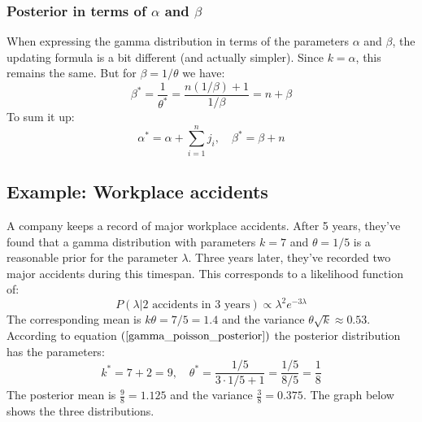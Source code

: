 \documentclass[12pt, a4paper]{article}
\begin{document}
\subsubsection{Posterior in terms of $\alpha$ and $\beta$}
When expressing the gamma distribution in terms of the parameters $\alpha$ and $\beta$, the updating formula is a bit different (and actually simpler). Since $k=\alpha$, this remains the same. But for $\beta=1/\theta$ we have:
\begin{equation}
\beta^*=\frac{1}{\theta^*}=\frac{n(1/\beta)+1}{1/\beta}=n+\beta
\end{equation}
To sum it up:
\begin{equation}
\alpha^*=\alpha+\sum_{i=1}^n j_i,\quad\beta^*=\beta+n
\end{equation}

\subsection{Example: Workplace accidents}
A company keeps a record of major workplace accidents. After 5 years, they've found that a gamma distribution with parameters $k=7$ and $\theta=1/5$ is a reasonable prior for the parameter $\lambda$. Three years later, they've recorded two major accidents during this timespan. This corresponds to a likelihood function of:
\begin{equation}
P(\lambda|2\textrm{ accidents in }3\textrm{ years})\propto \lambda^{2}e^{-3\lambda}
\end{equation}
The corresponding mean is $k\theta=7/5=1.4$ and the variance $\theta\sqrt{k}\approx 0.53$. According to equation $(\ref{gamma_poisson_posterior})$ the posterior distribution has the parameters:
\begin{equation}
k^*=7+2=9,\quad\theta^*=\frac{1/5}{3\cdot 1/5+1}=\frac{1/5}{8/5}=\frac{1}{8}
\end{equation}
The posterior mean is $\frac{9}{8}=1.125$ and the variance $\frac{3}{8}=0.375$. The graph below shows the three distributions.

\end{document}

